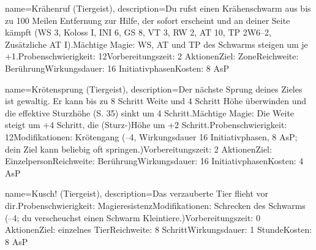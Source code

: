 {
    name={Krähenruf  (Tiergeist)},
    description={Du rufst einen Krähenschwarm aus bis zu 100 Meilen Entfernung zur Hilfe, der sofort erscheint und an deiner Seite kämpft (WS 3, Koloss I, INI 6, GS 8, VT 3, RW 2, AT 10, TP 2W6–2, Zusätzliche AT I).\newline Mächtige Magie: WS, AT und TP des Schwarms steigen um je +1.\newline Probenschwierigkeit: 12\newline Vorbereitungszeit: 2 Aktionen\newline Ziel: Zone\newline Reichweite: Berührung\newline Wirkungsdauer: 16 Initiativphasen\newline Kosten: 8 AsP}
}


{
    name={Krötensprung (Tiergeist)},
    description={Der nächste Sprung deines Zieles ist gewaltig. Er kann bis zu 8 Schritt Weite und 4 Schritt Höhe überwinden und die effektive Sturzhöhe (S. 35) sinkt um 4 Schritt.\newline Mächtige Magie: Die Weite steigt um +4 Schritt,  die (Sturz-)Höhe um +2 Schritt.\newline Probenschwierigkeit: 12\newline Modifikationen: Krötengang (–4, Wirkungsdauer 16 Initiativphasen, 8 AsP; dein Ziel kann beliebig oft springen.)\newline Vorbereitungszeit: 2 Aktionen\newline Ziel: Einzelperson\newline Reichweite: Berührung\newline Wirkungsdauer: 16 Initiativphasen\newline Kosten: 4 AsP}
}


{
    name={Kusch! (Tiergeist)},
    description={Das verzauberte Tier flieht vor dir.\newline Probenschwierigkeit: Magieresistenz\newline Modifikationen: Schrecken des Schwarms (–4; du verscheuchst einen Schwarm Kleintiere.)\newline Vorbereitungszeit: 0 Aktionen\newline Ziel: einzelnes Tier\newline Reichweite: 8 Schritt\newline Wirkungsdauer: 1 Stunde\newline Kosten: 8 AsP}
}



